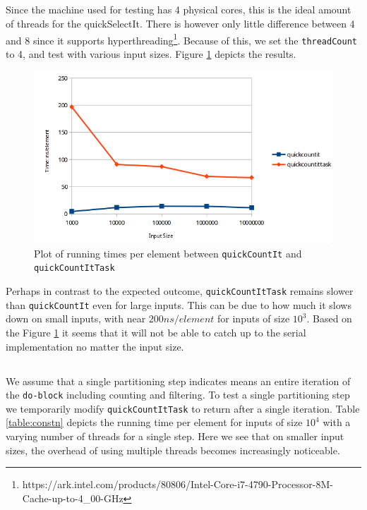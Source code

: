 \documentclass[a5paper]{article}
\begin{document}
\subsection{}
Since the machine used for testing has 4 physical cores, this is the ideal amount of threads for the quickSelectIt. There is however only little difference between 4 and 8 since it supports hyperthreading\footnote{https://ark.intel.com/products/80806/Intel-Core-i7-4790-Processor-8M-Cache-up-to-4\_00-GHz}. Because of this, we set the \texttt{threadCount} to 4, and test with various input sizes. Figure \ref{fig:compTask} depicts the results. 
\begin{figure}[!ht]
    \centering
    \noindent\includegraphics[scale=0.5]{res/graph_task.png}
    \caption{Plot of running times per element between \texttt{quickCountIt} and \texttt{quickCountItTask}}
    \label{fig:compTask}
\end{figure}

Perhaps in contrast to the expected outcome, \texttt{quickCountItTask} remains slower than \texttt{quickCountIt} even for large inputs. This can be due to how much it slows down on small inputs, with near $200ns/element$ for inputs of size $10^3$. Based on the Figure \ref{fig:compTask} it seems that it will not be able to catch up to the serial implementation no matter the input size.

\subsection{}
We assume that a single partitioning step indicates means an entire iteration of the \texttt{do-block} including counting and filtering. To test a single partitioning step we temporarily modify \texttt{quickCountItTask} to return after a single iteration. Table \ref{table:constn} depicts the running time per element for inputs of size $10^4$ with a varying number of threads for a single step. Here we see that on smaller input sizes, the overhead of using multiple threads becomes increasingly noticeable.
\end{document}
